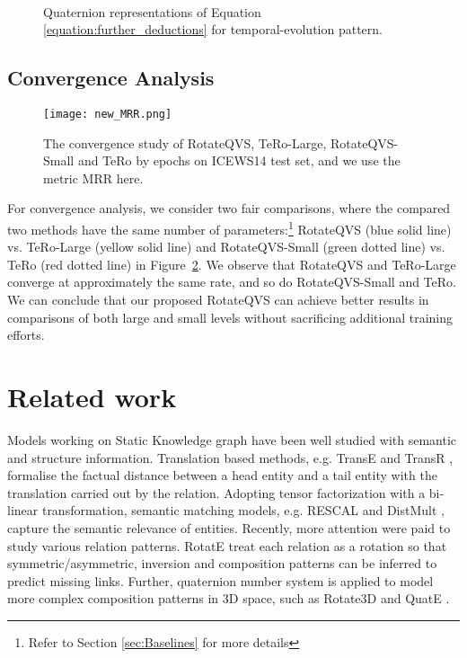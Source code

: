 \documentclass[11pt]{article}
\begin{document}
\begin{figure}[!t]
  \centering
	 \\
  \caption{Quaternion representations of Equation \ref{equation:further_deductions} for temporal-evolution pattern.}
  \label{figure:tp_deduction}
\end{figure}


\subsection{Convergence Analysis}
\begin{figure}[t!]
\centering
\texttt{[image: new\_MRR.png]} 
\caption{The convergence study of RotateQVS, TeRo-Large, RotateQVS-Small and TeRo by epochs on ICEWS14 test set, and we use the metric MRR here.}
\label{figure:convergence}
\vspace{-0.1in}
\end{figure}

For convergence analysis, we consider two fair comparisons, where the compared two methods have the same number of parameters:\footnote{Refer to Section \ref{sec:Baselines} for more details} RotateQVS (\textcolor{myblue}{blue solid} line) vs. TeRo-Large (\textcolor{myyellow}{yellow solid} line) and RotateQVS-Small (\textcolor{mygreen}{green dotted} line) vs. TeRo (\textcolor{myred}{red dotted} line) in Figure~\ref{figure:convergence}.
We observe that RotateQVS and TeRo-Large converge at approximately the same rate, and so do RotateQVS-Small and TeRo.
We can conclude that our proposed RotateQVS can achieve better results in comparisons of both large and small levels without sacrificing additional training efforts.



\section{Related work}


Models working on Static Knowledge graph have been well studied \cite{crosse,XuRKKA20,MaoWXLW20,BISC} with semantic and structure information. Translation based methods, e.g. TransE \cite{bordes2013translating} and TransR \cite{linlearning}, formalise the factual distance between a head entity  and a tail entity  with the translation carried out by the relation. Adopting tensor factorization with a bi-linear transformation, semantic matching models, e.g. RESCAL \cite{nickel2013tensor} and DistMult \cite{Yang2015EmbeddingEA}, capture the semantic relevance of entities. Recently, more attention were paid to study various relation patterns. RotatE \cite{SunDNT19} treat each relation as a rotation so that symmetric/asymmetric, inversion and composition patterns can be inferred to predict missing links. Further, quaternion number system \cite{Hamilton1844} is applied to model more complex composition patterns in 3D space, such as Rotate3D \cite{gao2020rotate3d} and QuatE \cite{zhang2019quaternion}.
\end{document}
